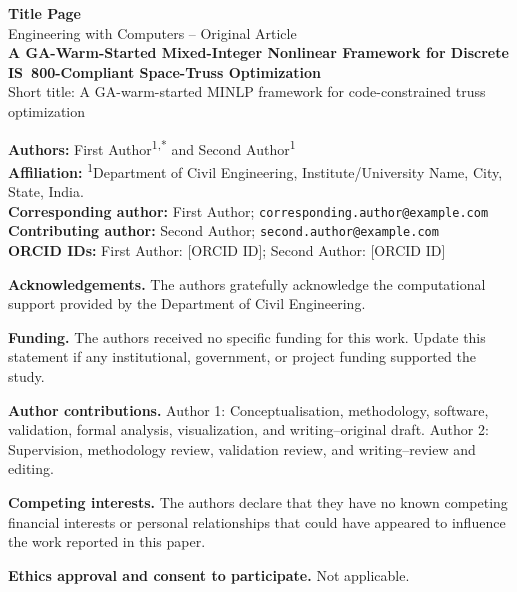\documentclass[lineno,pdflatex,sn-mathphys-num]{sn-jnl}
\begin{document}
\begin{titlepage}
\thispagestyle{empty}
\small
\begin{center}
{\Large\bfseries Title Page}\\[0.7em]
{Engineering with Computers -- Original Article}\\[1.0em]
{\LARGE\bfseries A GA-Warm-Started Mixed-Integer Nonlinear Framework for Discrete IS~800-Compliant Space-Truss Optimization}\\[0.5em]
{\footnotesize Short title: A GA-warm-started MINLP framework for code-constrained truss optimization}
\end{center}

\vspace{0.7em}
\noindent\textbf{Authors:} First Author\textsuperscript{1,*} and Second Author\textsuperscript{1}\\
\textbf{Affiliation:} \textsuperscript{1}Department of Civil Engineering, Institute/University Name, City, State, India.\\
\textbf{Corresponding author:} First Author; \texttt{corresponding.author@example.com}\\
\textbf{Contributing author:} Second Author; \texttt{second.author@example.com}\\
\textbf{ORCID IDs:} First Author: [ORCID ID]; Second Author: [ORCID ID]

\vspace{0.7em}
\noindent\textbf{Acknowledgements.} The authors gratefully acknowledge the computational support provided by the Department of Civil Engineering.

\vspace{0.45em}
\noindent\textbf{Funding.} The authors received no specific funding for this work. Update this statement if any institutional, government, or project funding supported the study.

\vspace{0.45em}
\noindent\textbf{Author contributions.} Author 1: Conceptualisation, methodology, software, validation, formal analysis, visualization, and writing--original draft. Author 2: Supervision, methodology review, validation review, and writing--review and editing.

\vspace{0.45em}
\noindent\textbf{Competing interests.} The authors declare that they have no known competing financial interests or personal relationships that could have appeared to influence the work reported in this paper.

\vspace{0.45em}
\noindent\textbf{Ethics approval and consent to participate.} Not applicable.


\end{titlepage}
\end{document}
